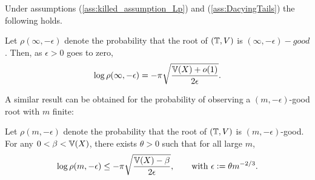 Under assumptions (\ref{ass:killed_assumption_Lp}) and (\ref{ass:DacyingTails}) the following holds. 
\begin{theorem}\label{thm:infty_good}
Let $\rho(\infty, - \epsilon)$ denote the probability that the root of $(\mathbb{T}, V)$ is $(\infty, - \epsilon)-good$. Then, as $\epsilon > 0$ goes to zero, 
\begin{equation}\nonumber
\log\rho(\infty, - \epsilon) = - \pi \sqrt{\frac{\mathbb{V}(X) + o(1)}{2 \epsilon}}. 
\end{equation}
\end{theorem}

A similar result can be obtained for the probability of observing a $(m, - \epsilon)$-good root with $m$ finite:
\begin{theorem}\label{thm:finite_good}
Let $\rho(m, - \epsilon)$ denote the probability that the root of $(\mathbb{T}, V)$ is $(m, - \epsilon)$-good. For any $0 < \beta < \mathbb{V}(X)$, there exists $\theta > 0$ such that for all large $m$, 
\begin{equation}\nonumber
\log \rho(m, - \epsilon) \leq - \pi \sqrt{\frac{\mathbb{V}(X) - \beta}{2 \epsilon}}, \qquad \text{with } \epsilon \vcentcolon= \theta m^{-2/3}. 
\end{equation}
\end{theorem}

\newpage